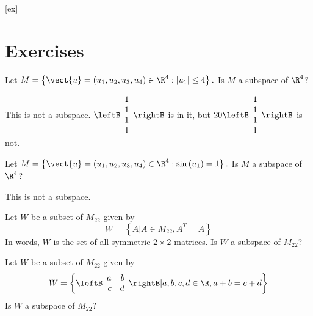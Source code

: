 [ex]
\section*{Exercises}

\begin{enumialphparenastyle}

\begin{ex} Let $M=\left\{ \vect{u}=\left( u_{1},u_{2},u_{3},u_{4}\right) \in 
\R^{4}:\left| u_{1}\right| \leq 4\right\} .$ Is $M$ a subspace of $\R^4$?
\begin{sol}
This is not a subspace. $\leftB \begin{array}{r}
1 \\
1 \\
1 \\
1
\end{array}
\rightB $ is in
it, but $20\leftB 
\begin{array}{r}
1 \\
1 \\
1 \\
1
\end{array}
\rightB $ is not. 
\end{sol}
\end{ex}

\begin{ex} Let $M=\left\{ \vect{u}=\left( u_{1},u_{2},u_{3},u_{4}\right) \in 
\R^{4}:\sin \left( u_{1}\right) =1\right\} .$ Is $M$ a subspace of $\R^4$?
\begin{sol}
This is not a subspace.
\end{sol}
\end{ex}

\begin{ex} Let $W$ be a subset of $M_{22}$ given by 
\[
W = \left\{ A | A \in M_{22}, A^T = A \right\}  
\]
In words, $W$ is the set of all symmetric $2 \times 2$ matrices. Is $W$ a subspace of $M_{22}$?
\end{ex}

\begin{ex} Let $W$ be a subset of $M_{22}$ given by 
\[
W = \left\{ \leftB \begin{array}{rr}
a  & b \\
c & d 
\end{array} \rightB | a,b,c,d \in \R, a + b = c + d \right\}
\]
Is $W$ a subspace of $M_{22}$?
\end{ex}


\end{enumialphparenastyle}
